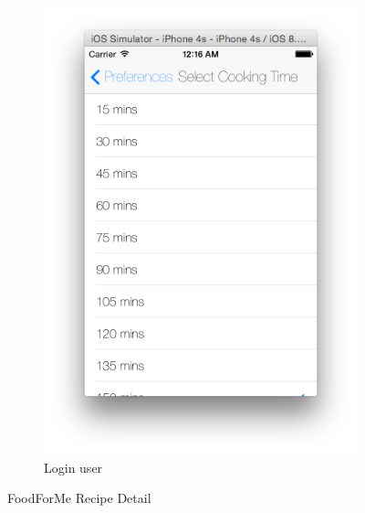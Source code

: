 \begin{figure}[h]
\begin{subfigure}{.32\textwidth}
	  		\includegraphics[width=.9\linewidth]{figures/ch4_app_screen_shots/preferences/peferences_cooking_time.png}
	  		\caption{Login user}
	  	\end{subfigure}
	  	\caption{FoodForMe Recipe Detail}
	  	\label{fig:foodforme_main_menu_sreen}
	  \end{figure}
	  
